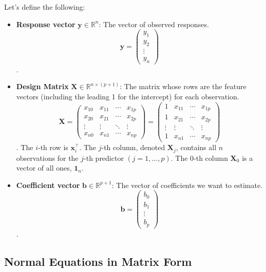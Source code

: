 \documentclass[11pt, letterpaper]{article}
\theoremstyle{definition}
\newcommand{\R}{\mathbb{R}}
\newcommand{\mat}[1]{\mathbf{#1}} %
\newcommand{\vect}[1]{\mathbf{#1}} %
\begin{document}
Let's define the following:
\begin{itemize}
    \item \textbf{Response vector} $\vect{y} \in \R^n$: The vector of observed responses.
    \[
    \vect{y} = \begin{pmatrix} y_1 \\ y_2 \\ \vdots \\ y_n \end{pmatrix}
    \]
   .
    \item \textbf{Design Matrix} $\mat{X} \in \R^{n \times (p+1)}$: The matrix whose rows are the feature vectors (including the leading 1 for the intercept) for each observation.
    \[
    \mat{X} = \begin{pmatrix}
    x_{10} & x_{11} & \cdots & x_{1p} \\
    x_{20} & x_{21} & \cdots & x_{2p} \\
    \vdots & \vdots & \ddots & \vdots \\
    x_{n0} & x_{n1} & \cdots & x_{np}
    \end{pmatrix} = \begin{pmatrix}
    1 & x_{11} & \cdots & x_{1p} \\
    1 & x_{21} & \cdots & x_{2p} \\
    \vdots & \vdots & \ddots & \vdots \\
    1 & x_{n1} & \cdots & x_{np}
    \end{pmatrix}
    \]
   . The $i$-th row is $\vect{x}_i^{\top}$. The $j$-th column, denoted $\vect{X}_j$, contains all $n$ observations for the $j$-th predictor $(j=1, \dots, p)$. The 0-th column $\vect{X}_0$ is a vector of all ones, $\vect{1}_n$.
    \item \textbf{Coefficient vector} $\vect{b} \in \R^{p+1}$: The vector of coefficients we want to estimate.
    \[
    \vect{b} = \begin{pmatrix} b_0 \\ b_1 \\ \vdots \\ b_p \end{pmatrix}
    \]
   .
\end{itemize}

\subsection{Normal Equations in Matrix Form}
\end{document}
